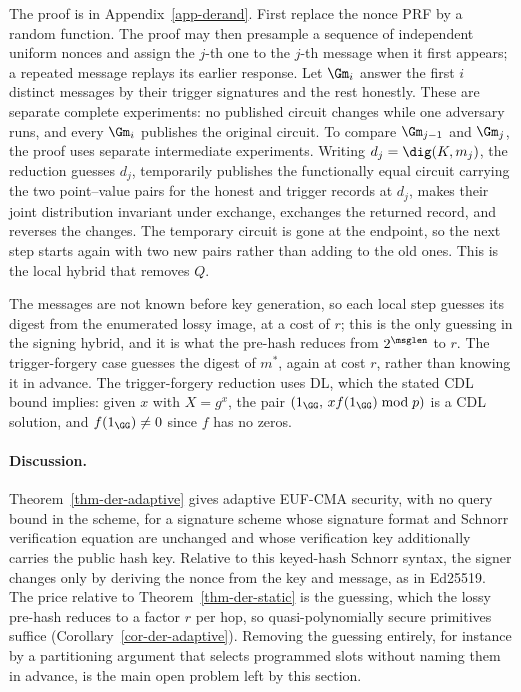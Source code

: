 The proof is in Appendix~\ref{app-derand}. First replace the nonce PRF by a random function. The proof may then presample a sequence of independent uniform nonces and assign the $j$-th one to the $j$-th message when it first appears; a repeated message replays its earlier response. Let $\Gm_i$ answer the first $i$ distinct messages by their trigger signatures and the rest honestly. These are separate complete experiments: no published circuit changes while one adversary runs, and every $\Gm_i$ publishes the original circuit. To compare $\Gm_{j-1}$ and $\Gm_j$, the proof uses separate intermediate experiments. Writing $d_j=\dig(K,m_j)$, the reduction guesses $d_j$, temporarily publishes the functionally equal circuit carrying the two point--value pairs for the honest and trigger records at $d_j$, makes their joint distribution invariant under exchange, exchanges the returned record, and reverses the changes. The temporary circuit is gone at the endpoint, so the next step starts again with two new pairs rather than adding to the old ones. This is the local hybrid that removes $Q$.

The messages are not known before key generation, so each local step guesses its digest from the enumerated lossy image, at a cost of $r$; this is the only guessing in the signing hybrid, and it is what the pre-hash reduces from $2^{\msglen}$ to $r$. The trigger-forgery case guesses the digest of $m^*$, again at cost $r$, rather than knowing it in advance. The trigger-forgery reduction uses DL, which the stated CDL bound implies: given $x$ with $X = g^x$, the pair $(1_\GG,\, x f(1_\GG)\bmod p)$ is a CDL solution, and $f(1_\GG)\ne0$ since $f$ has no zeros.

\paragraph*{Discussion.} Theorem~\ref{thm-der-adaptive} gives adaptive EUF-CMA security, with no query bound in the scheme, for a signature scheme whose signature format and Schnorr verification equation are unchanged and whose verification key additionally carries the public hash key. Relative to this keyed-hash Schnorr syntax, the signer changes only by deriving the nonce from the key and message, as in Ed25519. The price relative to Theorem~\ref{thm-der-static} is the guessing, which the lossy pre-hash reduces to a factor $r$ per hop, so quasi-polynomially secure primitives suffice (Corollary~\ref{cor-der-adaptive}). Removing the guessing entirely, for instance by a partitioning argument that selects programmed slots without naming them in advance, is the main open problem left by this section.

